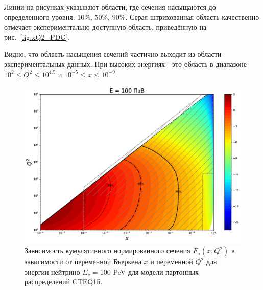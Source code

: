 Линии на рисунках указывают области, где сечения насыщаются до определенного уровня: $10\%$, $50\%$, $90\%$. Серая штрихованная область качественно отмечает экспериментально доступную область, приведённую на рис.~\ref{fig:xQ2_PDG}.

Видно, что область насыщения сечений частично выходит из области экспериментальных данных. При высоких энергиях  - это область в диапазоне $10^2\le Q^2\le10^{4.5} $ и $10^{-5}\le x \le 10^{-9}$.  
\begin{figure}[!h]
\centering
\includegraphics[width=0.97\linewidth]{images/NuProp/cdfxq2_cc_proton_CT18ZNNLO_14_100000000.pdf}
\caption{Зависимость кумулятивного нормированного сечения $F_{\sigma}(x,Q^2)$ в зависимости от переменной Бъеркена $x$ и переменной $Q^2$ для энергии нейтрино $E_{\nu} = 100$ PeV для модели партонных распределений CTEQ15\cite{ncteq15}.}
\label{Pp8}
\end{figure}
